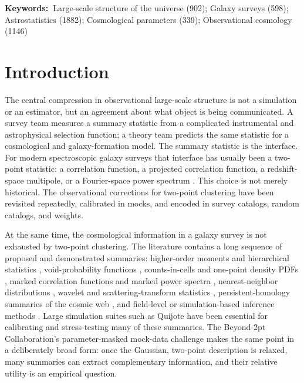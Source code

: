 \documentclass[apj]{emulateapj}
\providecommand{\keywords}[1]{\par\noindent\textbf{Keywords:\ }#1\par}
\begin{document}
\keywords{Large-scale structure of the universe (902); Galaxy surveys (598);
Astrostatistics (1882); Cosmological parameters (339); Observational cosmology
(1146)}

\maketitle

\section{Introduction}
\label{sec:intro}

The central compression in observational large-scale structure is not a
simulation or an estimator, but an agreement about what object is being
communicated.  A survey team measures a summary statistic from a complicated
instrumental and astrophysical selection function; a theory team predicts the
same statistic for a cosmological and galaxy-formation model.  The summary
statistic is the interface.  For modern spectroscopic galaxy surveys that
interface has usually been a two-point statistic: a correlation function, a
projected correlation function, a redshift-space multipole, or a Fourier-space
power spectrum \citep{DavisPeebles1983,LandySzalay1993,Hamilton1993,FKP1994}.
This choice is not merely historical.  The observational corrections for
two-point clustering have been revisited repeatedly, calibrated in mocks, and
encoded in survey catalogs, random catalogs, and weights.

At the same time, the cosmological information in a galaxy survey is not
exhausted by two-point clustering.  The literature contains a long sequence of
proposed and demonstrated summaries: higher-order moments and hierarchical
statistics \citep{SzapudiSzalay1993,FryGaztanaga1993}, void-probability
functions \citep{Einasto1991}, counts-in-cells and one-point density PDFs
\citep{Baugh1995,Szapudi1996,Uhlemann2020,Friedrich2020}, marked correlation
functions and marked power spectra \citep{Harker2006,Satpathy2019,Massara2021,
Massara2023}, nearest-neighbor distributions \citep{BanerjeeAbel2021,Yuan2024},
wavelet and scattering-transform statistics \citep{Cheng2020,Valogiannis2022,
Regaldo2024}, persistent-homology summaries of the cosmic web
\citep{Wilding2021,Biagetti2022,Yip2024}, and field-level or
simulation-based inference methods \citep{JascheWandelt2013,Nguyen2024,
Lemos2024,Hahn2023Mock,Hahn2023PNAS,Hahn2024NatAs,Hahn2024Bispectrum,
Massara2025SBI}.  Large simulation suites such as Quijote
\citep{Quijote2020} have been essential for calibrating and stress-testing
many of these summaries.  The Beyond-2pt Collaboration's parameter-masked mock-data
challenge \citep{Beyond2pt2025} makes the same point in a deliberately broad
form: once the Gaussian, two-point description is relaxed, many summaries can
extract complementary information, and their relative utility is an empirical
question.
\end{document}
